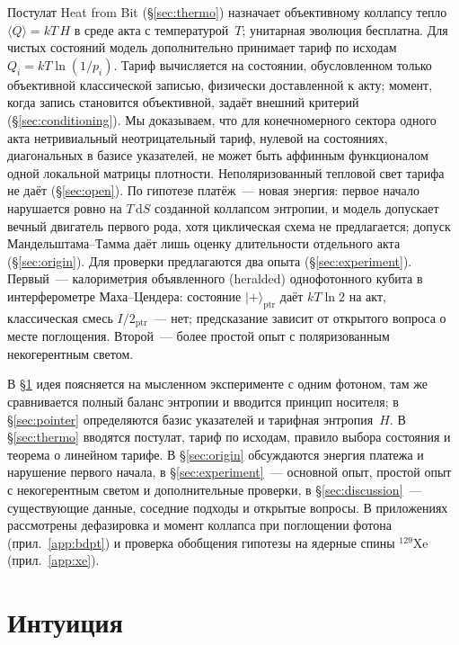 \documentclass[11pt,a4paper]{article}
\newcommand{\Sref}[1]{\hyperref[#1]{\S\ref{#1}}}
\begin{document}
Постулат Heat from Bit (\Sref{sec:thermo}) назначает объективному коллапсу тепло $\langle Q\rangle=kT\,H$ в среде акта с температурой~$T$; унитарная эволюция бесплатна. Для чистых состояний модель дополнительно принимает тариф по исходам $Q_i=kT\ln(1/p_i)$. Тариф вычисляется на состоянии, обусловленном только объективной классической записью, физически доставленной к акту; момент, когда запись становится объективной, задаёт внешний критерий (\Sref{sec:conditioning}). Мы доказываем, что для конечномерного сектора одного акта нетривиальный неотрицательный тариф, нулевой на состояниях, диагональных в базисе указателей, не может быть аффинным функционалом одной локальной матрицы плотности. Неполяризованный тепловой свет тарифа не даёт (\Sref{sec:open}). По гипотезе платёж~--- новая энергия: первое начало нарушается ровно на $T\,\mathrm{d}S$ созданной коллапсом энтропии, и модель допускает вечный двигатель первого рода, хотя циклическая схема не предлагается; допуск Мандельштама--Тамма даёт лишь оценку длительности отдельного акта (\Sref{sec:origin}). Для проверки предлагаются два опыта (\Sref{sec:experiment}). Первый~--- калориметрия объявленного (heralded) однофотонного кубита в интерферометре Маха--Цендера: состояние $|{+}\rangle_{\mathrm{ptr}}$ даёт $kT\ln 2$ на акт, классическая смесь $I/2_{\mathrm{ptr}}$~--- нет; предсказание зависит от открытого вопроса о месте поглощения. Второй~--- более простой опыт с поляризованным некогерентным светом.

В \Sref{sec:intuition} идея поясняется на мысленном эксперименте с одним фотоном, там же сравнивается полный баланс энтропии и вводится принцип носителя; в \Sref{sec:pointer} определяются базис указателей и тарифная энтропия~$H$. В \Sref{sec:thermo} вводятся постулат, тариф по исходам, правило выбора состояния и теорема о линейном тарифе. В \Sref{sec:origin} обсуждаются энергия платежа и нарушение первого начала, в \Sref{sec:experiment}~--- основной опыт, простой опыт с некогерентным светом и дополнительные проверки, в \Sref{sec:discussion}~--- существующие данные, соседние подходы и открытые вопросы. В приложениях рассмотрены дефазировка и момент коллапса при поглощении фотона (прил.~\ref{app:bdpt}) и проверка обобщения гипотезы на ядерные спины $^{129}$Xe (прил.~\ref{app:xe}).

\section{Интуиция}\label{sec:intuition}
\end{document}
